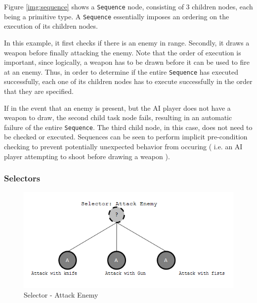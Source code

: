             Figure \ref{img:sequence} shows a \texttt{Sequence} node, consisting of 3 children nodes, each being a primitive type. A \texttt{Sequence} essentially imposes an ordering on the execution of its children nodes. 
            
            In this example, it first checks if there is an enemy in range. Secondly, it draws a weapon before finally attacking the enemy. Note that the order of execution is important, since logically, a weapon has to be drawn before it can be used to fire at an enemy. Thus, in order to determine if the entire \texttt{Sequence} has executed successfully, each one of its children nodes has to execute successfully in the order that they are specified. 
            
            If in the event that an enemy is present, but the AI player does not have a weapon to draw, the second child task node fails, resulting in an automatic failure of the entire \texttt{Sequence}. The third child node, in this case, does not need to be checked or executed. Sequences can be seen to perform implicit pre-condition checking to prevent potentially unexpected behavior from occuring ( i.e. an AI player attempting to shoot before drawing a weapon ).
                        
            \subsubsection{Selectors}
            
            \begin{figure}[h]
                
                \begin{center}
                \includegraphics[scale=1.0]{images/selector.png}
                \caption{Selector - Attack Enemy}
                \label{img:selector}
                \end{center}            
            \end{figure} 
            

